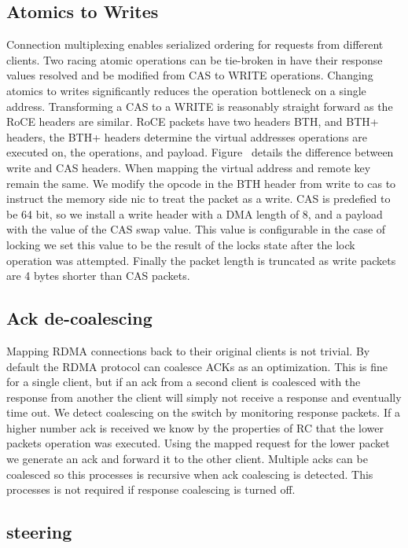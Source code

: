 \subsection{Atomics to Writes}

Connection multiplexing enables serialized ordering for
requests from different clients. Two racing atomic
operations can be tie-broken in {\sword} have their response
values resolved and be modified from CAS to WRITE
operations. Changing atomics to writes significantly reduces
the operation bottleneck on a single address. 
Transforming a CAS to a WRITE is reasonably straight forward
as the RoCE headers are similar. RoCE packets have two
headers BTH, and BTH+ headers, the BTH+ headers determine
the virtual addresses operations are executed on, the
operations, and payload. Figure~ details
the difference between write and CAS headers. When mapping
the virtual address and remote key remain the same. We
modify the opcode in the BTH header from write to cas to
instruct the memory side nic to treat the packet as a write.
CAS is predefied to be 64 bit, so we install a write header
with a DMA length of 8, and a payload with the value of the
CAS swap value. This value is configurable in the case of
locking we set this value to be the result of the locks
state after the lock operation was attempted. Finally the
packet length is truncated as write packets are 4 bytes
shorter than CAS packets.

\subsection{Ack de-coalescing}

Mapping RDMA connections back to their original clients is
not trivial. By default the RDMA protocol can coalesce ACKs
as an optimization. This is fine for a single client, but if
an ack from a second client is coalesced with the response
from another the client will simply not receive a response
and eventually time out. We detect coalescing on the switch
by monitoring response packets. If a higher number ack is
received we know by the properties of RC that the lower
packets operation was executed. Using the mapped request for
the lower packet we generate an ack and forward it to the
other client. Multiple acks can be coalesced so this
processes is recursive when ack coalescing is detected. This
processes is not required if response coalescing is turned
off.

\subsection{steering}





